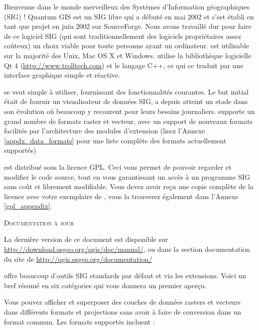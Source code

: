 \mainmatter
{}\label{label_forward}


Bienvenue dans le monde merveilleux des Systèmes d'Information géographiques (SIG) ! Quantum GIS est un SIG libre qui a débuté en mai 2002 et s'est établi en tant que projet en juin 2002 sur SourceForge. Nous avons travaillé dur pour faire de ce logiciel SIG (qui sont traditionnellement des logiciels propriétaires assez coûteux) un choix viable pour toute personne ayant un ordinateur. \qg est utilisable sur la majorité des Unix, Mac OS X et Windows. \qg utilise la bibliothèque logicielle Qt 4 (\url{http://www.trolltech.com}) et le langage C++, ce qui ce traduit par une interface graphique simple et réactive.

\qg se veut simple à utiliser, fournissant des fonctionnalités courantes. Le but initial était de fournir un visualisateur de données SIG, \qg a depuis atteint un stade dans son évolution où beaucoup y recourent pour leurs besoins journaliers. \qg supporte un grand nombre de formats raster et vecteur, avec un support de nouveaux formats facilités par l'architecture des modules d'extension (lisez l'Annexe \ref{appdx_data_formats} pour une liste complète des formats actuellement supportés)

\qg est distribué sous la licence GPL. Ceci vous permet de pouvoir regarder et modifier le code source, tout en vous garantissant un accès à un programme SIG sans coût et librement modifiable. Vous devez avoir reçu une copie complète de la licence avec votre exemplaire de \qg, vous la trouverez également dans l'Annexe \ref{gpl_appendix}.

\begin{Astuce}\caption{\textsc{Documentation à jour}}
La dernière version de ce document est disponible sur \url{http://download.osgeo.org/qgis/doc/manual/}, ou dans la section documentation du site de \qg \url{http://qgis.osgeo.org/documentation/}
\end{Astuce}

\label{label_majfeat}

\qg offre beaucoup d'outils SIG standards par défaut et via les extensions. Voici un bref résumé en six catégories qui vous donnera un premier aperçu.


Vous pouvez afficher et superposer des couches de données rasters et vecteurs dans différents formats et projections sans avoir à faire de conversion dans un format commun. Les formats supportés incluent :

